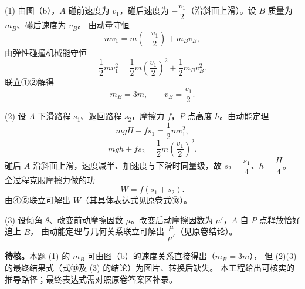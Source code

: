 \begin{answer}
(1) 由图（b），$A$ 碰前速度为 $v_{1}$，碰后速度为 $-\dfrac{v_{1}}{2}$（沿斜面上滑）。设 $B$ 质量为 $m_{B}$、碰后速度为 $v_{B}$。
由动量守恒
\[
  mv_{1}=m\left(-\frac{v_{1}}{2}\right)+m_{B}v_{B}, \tag{①}
\]
由弹性碰撞机械能守恒
\[
  \frac{1}{2}mv_{1}^{2}=\frac{1}{2}m\left(\frac{v_{1}}{2}\right)^{2}+\frac{1}{2}m_{B}v_{B}^{2}. \tag{②}
\]
联立①②解得
\[
  m_{B}=3m,\qquad v_{B}=\frac{v_{1}}{2}.
\]

(2) 设 $A$ 下滑路程 $s_{1}$、返回路程 $s_{2}$，摩擦力 $f$，$P$ 点高度 $h$。由动能定理
\[
  mgH-fs_{1}=\frac{1}{2}mv_{1}^{2}, \tag{④}
\]
\[
  mgh+fs_{2}=\frac{1}{2}m\left(\frac{v_{1}}{2}\right)^{2}. \tag{⑤}
\]
碰后 $A$ 沿斜面上滑，速度减半、加速度与下滑时同量级，故 $s_{2}=\dfrac{s_{1}}{4}$、$h=\dfrac{H}{4}$。
全过程克服摩擦力做的功
\[
  W=f(s_{1}+s_{2}).
\]
由④⑤联立可解出 $W$（其具体表达式见原卷式⑩）。

(3) 设倾角 $\theta$、改变前动摩擦因数 $\mu$。改变后动摩擦因数为 $\mu'$，$A$ 自 $P$ 点释放恰好追上 $B$，
由动能定理与几何关系联立可解出 $\dfrac{\mu}{\mu'}$（见原卷结论）。

\begin{gktip}
\textbf{待核。}本题 (1) 的 $m_{B}$ 可由图（b）的速度关系直接得出（$m_{B}=3m$），
但 (2)(3) 的最终结果式（式⑩及 (3) 的结论）为图片、转换后缺失。
本工程给出可核实的推导路径；最终表达式需对照原卷答案区补录。
\end{gktip}
\end{answer}

